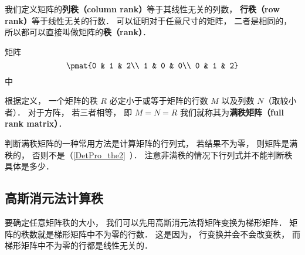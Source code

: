 

我们定义矩阵的\textbf{列秩（column rank）}等于其线性无关的列数， \textbf{行秩（row rank）}等于线性无关的行数． 可以证明对于任意尺寸的矩阵， 二者是相同的， 所以都可以直接叫做矩阵的\textbf{秩（rank）}．

\begin{example}{}
矩阵
\begin{equation}
\pmat{0 & 1 & 2\\ 1 & 0 & 0\\ 0 & 1 & 2}
\end{equation}
中
\end{example}

根据定义， 一个矩阵的秩 $R$ 必定小于或等于矩阵的行数 $M$ 以及列数 $N$（取较小者）． 对于方阵， 若三者相等， 即 $M = N = R$ 我们就称其为\textbf{满秩矩阵（full rank matrix）}．

判断满秩矩阵的一种常用方法是计算矩阵的行列式， 若结果不为零， 则矩阵是满秩的， 否则不是（\autoref{DetPro_the2}~）． 注意非满秩的情况下行列式并不能判断秩具体是多少．


\subsection{高斯消元法计算秩}
要确定任意矩阵秩的大小， 我们可以先用高斯消元法将矩阵变换为梯形矩阵． 矩阵的秩数就是梯形矩阵中不为零的行数． 这是因为， 行变换并会不会改变秩， 而梯形矩阵中不为零的行都是线性无关的．
